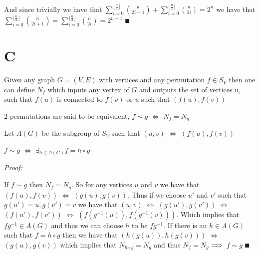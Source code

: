 \documentclass[paper=a4,fontsize=paper,12.5pt]{book}
\newcommand{\3}{\vspace*{3mm}}
\newcommand{\Proof}{\textit{Proof:}}
\newcommand{\IFF}{$\Longleftrightarrow$ \hspace*{.5mm}}
\newcommand{\RIGHT}{\Longrightarrow \hspace*{.5mm}}
\newcommand*{\comb}[2]{\binom{#1}{#2}}
\begin{document}
\3

And since trivially we have that $\sum_{i = 0}^{\lfloor \frac{n}{2} \rfloor}\comb{n}{2i+1} + \sum_{i = 0}^{\lfloor \frac{n}{2} \rfloor}\comb{n}{2i} = {2}^{n}$ we have that $\sum_{i = 0}^{\lfloor \frac{n}{2} \rfloor}\comb{n}{2i+1} =  \sum_{i = 0}^{\lfloor \frac{n}{2} \rfloor}\comb{n}{2i}  = {2}^{n-1}$ $\QED$

\3

\section*{C}


\begin{definition}

Given any graph $G = (V,E)$ with vertices and any permutation $f \in {S}_{V}$ then one can define ${N}_{f}$ which inputs any vertex of $G$ and outputs the set of vertices u, such that $f(u)$ is connected to $f(v)$ or $u$ such that $(f(u),f(v))$

\3

$2$ permutations are said to be equivalent, $f \sim g$ \IFF ${N}_{f} = {N}_{g}$

\3

Let $A(G)$ be the subgroup of ${S}_{V}$ such that $(u,v)$ \IFF $(f(u),f(v))$

\end{definition}

\3

\begin{lemma}

$f \sim g$ \IFF ${\exists}_{h \in A(G)}f = h \circ g$



\end{lemma}

\Proof

If $f \sim g$ then ${N}_{f} = {N}_{g}$. So for any vertices $u$ and $v$ we have that $(f(u), f(v))$ \IFF $(g(u),g(v))$. Thus if we choose $u'$ and $v'$ such that $g(u') = u, g(v') = v$ we have that $(u,v)$ \IFF $(g(u'),g(v'))$ \IFF $(f(u'),f(v'))$ \IFF $(f({g}^{-1}(u)),f({g}^{-1}(v)))$. Which implies that ${f}{g}^{-1} \in A(G)$ and thus we can choose $h$ to be ${f}{g}^{-1}$. If there is an $h \in A(G)$ such that $f = h \circ g $ then we have that $(h(g(u)),h(g(v)))$ \IFF $(g(u),g(v))$ which implies that ${N}_{h \circ g} = {N}_{g}$ and thus ${N}_{f} = {N}_{g}$ $\RIGHT$ $f \sim g$ $\QED$



\newpage
\end{document}
